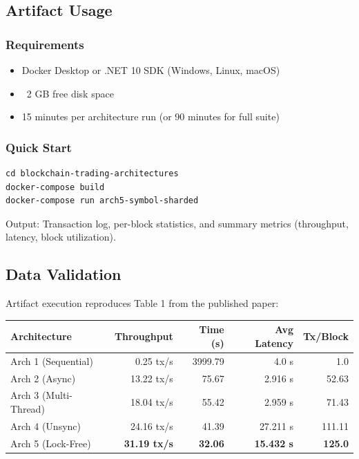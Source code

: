 \documentclass[conference]{IEEEtran}
\begin{document}
\subsection*{Artifact Usage}

\subsubsection*{Requirements}
\begin{itemize}
\item Docker Desktop or .NET 10 SDK (Windows, Linux, macOS)
\item ~2 GB free disk space
\item 15 minutes per architecture run (or 90 minutes for full suite)
\end{itemize}

\subsubsection*{Quick Start}
\begin{verbatim}
cd blockchain-trading-architectures
docker-compose build
docker-compose run arch5-symbol-sharded
\end{verbatim}

Output: Transaction log, per-block statistics, and summary metrics (throughput, latency, block utilization).

\subsection*{Data Validation}

Artifact execution reproduces Table 1 from the published paper:

\begin{table}[h]
\centering
\small
\begin{tabular}{|l|r|r|r|r|}
\hline
\textbf{Architecture} & \textbf{Throughput} & \textbf{Time (s)} & \textbf{Avg Latency} & \textbf{Tx/Block} \\
\hline
Arch 1 (Sequential) & 0.25 tx/s & 3999.79 & 4.0 s & 1.0 \\
Arch 2 (Async) & 13.22 tx/s & 75.67 & 2.916 s & 52.63 \\
Arch 3 (Multi-Thread) & 18.04 tx/s & 55.42 & 2.959 s & 71.43 \\
Arch 4 (Unsync) & 24.16 tx/s & 41.39 & 27.211 s & 111.11 \\
Arch 5 (Lock-Free) & \textbf{31.19 tx/s} & \textbf{32.06} & \textbf{15.432 s} & \textbf{125.0} \\
\hline
\end{tabular}
\end{table}
\end{document}
